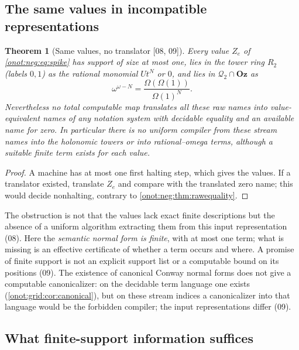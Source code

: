 \documentclass[11pt,oneside]{article}
\numberwithin{equation}{section}
\newtheorem{theorem}{Theorem}[section]
\theoremstyle{definition}
\theoremstyle{remark}
\newcommand{\Oz}{\mathbf{Oz}}
\newcommand{\QO}{\mathcal Q}
\newcommand{\Om}{\Omega}
\newcommand{\src}[1]{\textup{\textsf{\small[#1]}}}
\begin{document}
\subsection{The same values in incompatible representations}

\begin{theorem}[Same values, no translator \src{08, 09}]\label{onot:neg:thm:notranslator}
Every value $Z_e$ of \eqref{onot:neg:eq:spike} has support of size at most one,
lies in the tower ring $R_2$ (labels $0,1$) as the rational monomial $Ut^N$ or $0$,
and lies in $\QO_2\cap\Oz$ as
\[
 \omega^{\omega-N}=\frac{\Om(\Om(1))}{\Om(1)^N}.
\]
Nevertheless no total computable map translates all these raw names into value-
equivalent names of any notation system with decidable equality and an available
name for zero. In particular there is no uniform compiler from these stream names
into the holonomic towers or into rational--omega terms, although a suitable finite
term exists for each value.
\end{theorem}
\begin{proof}
A machine has at most one first halting step, which gives the values. If a
translator existed, translate $Z_e$ and compare with the translated zero name;
this would decide nonhalting, contrary to \cref{onot:neg:thm:rawequality}.
\end{proof}

The obstruction is not that the values lack exact finite descriptions but the
absence of a uniform algorithm extracting them from this input representation
(08). Here the \emph{semantic normal form is finite}, with at most one term; what
is missing is an effective certificate of whether a term occurs and where. A
promise of finite support is not an explicit support list or a computable bound
on its positions (09). The existence of canonical Conway normal forms does not
give a computable canonicalizer: on the decidable term language one exists
(\cref{onot:grid:cor:canonical}), but on these stream indices a canonicalizer into
that language would be the forbidden compiler; the input representations differ
(09).

\subsection{What finite-support information suffices}
\end{document}
